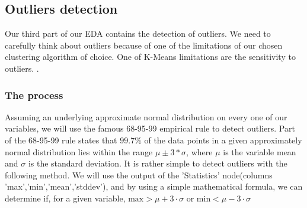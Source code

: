 \documentclass[11pt]{article}
\begin{document}
		\subsection*{Outliers detection}
			Our third part of our EDA contains the detection of outliers. We need to carefully think about outliers because of one of the limitations of our chosen clustering algorithm of choice. One of K-Means limitations are the sensitivity to outliers. \cite{k-means-sensitive}. 
			\subsubsection*{The process}
				Assuming an underlying approximate normal distribution on every one of our variables, we will use the famous 68-95-99 empirical rule\cite{3stddev-rule} to detect outliers. Part of the 68-95-99 rule states that $99.7\%$ of the data points in a given approximately normal distribution lies within the range $\mu \pm 3*\sigma$, where $\mu$ is the variable mean and $\sigma$ is the standard deviation. It is rather simple to detect outliers with the following method. We will use the output of the 'Statistics' node(columns 'max','min','mean','stddev'), and by using a simple mathematical formula, we can determine if, for a given variable, $\text{max}>\mu + 3\cdot\sigma$ or $\text{min}<\mu - 3\cdot\sigma$
\end{document}
